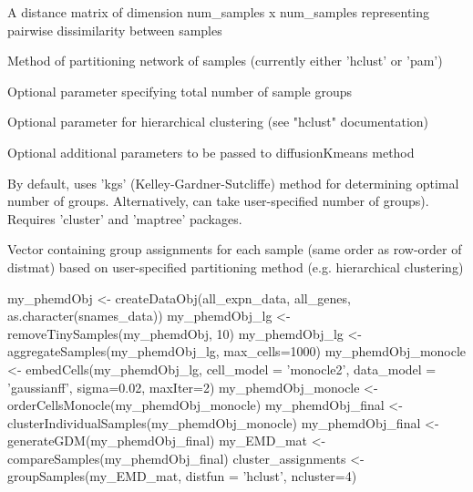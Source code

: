 \documentclass[a4paper]{book}
\begin{document}
\begin{Arguments}
\begin{ldescription}
\item[\code{distmat}] A distance matrix of dimension num\_samples x num\_samples representing pairwise dissimilarity between samples

\item[\code{distfun}] Method of partitioning network of samples (currently either 'hclust' or 'pam')

\item[\code{ncluster}] Optional parameter specifying total number of sample groups

\item[\code{method}] Optional parameter for hierarchical clustering (see "hclust" documentation)

\item[\code{...}] Optional additional parameters to be passed to diffusionKmeans method
\end{ldescription}
\end{Arguments}
%
\begin{Details}\relax
By default, uses 'kgs' (Kelley-Gardner-Sutcliffe) method for determining optimal number of groups. Alternatively, can take user-specified number of groups). Requires 'cluster' and 'maptree' packages.
\end{Details}
%
\begin{Value}
Vector containing group assignments for each sample (same order as row-order of distmat) based on user-specified partitioning method (e.g. hierarchical clustering)
\end{Value}
%
\begin{Examples}
\begin{ExampleCode}

my_phemdObj <- createDataObj(all_expn_data, all_genes, as.character(snames_data))
my_phemdObj_lg <- removeTinySamples(my_phemdObj, 10)
my_phemdObj_lg <- aggregateSamples(my_phemdObj_lg, max_cells=1000)
my_phemdObj_monocle <- embedCells(my_phemdObj_lg, cell_model = 'monocle2', data_model = 'gaussianff', sigma=0.02, maxIter=2)
my_phemdObj_monocle <- orderCellsMonocle(my_phemdObj_monocle)
my_phemdObj_final <- clusterIndividualSamples(my_phemdObj_monocle)
my_phemdObj_final <- generateGDM(my_phemdObj_final)
my_EMD_mat <- compareSamples(my_phemdObj_final)
cluster_assignments <- groupSamples(my_EMD_mat, distfun = 'hclust', ncluster=4)

\end{ExampleCode}
\end{Examples}
\end{document}

